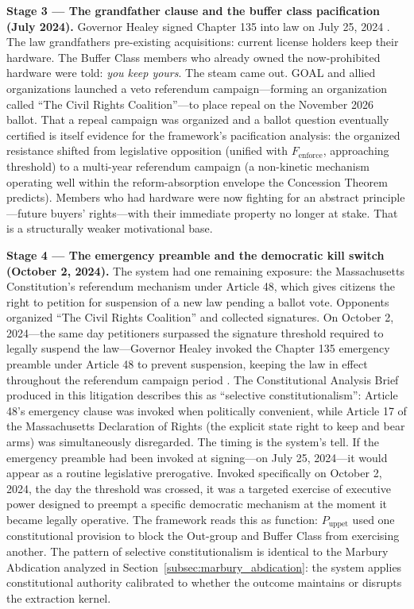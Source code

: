 \begin{keyinsight}
\textbf{Stage 3 --- The grandfather clause and the buffer class pacification (July 2024).} Governor Healey signed Chapter 135 into law on July 25, 2024 \cite{ma_chapter135_2024}. The law grandfathers pre-existing acquisitions: current license holders keep their hardware. The Buffer Class members who already owned the now-prohibited hardware were told: \textit{you keep yours}. The steam came out. GOAL and allied organizations launched a veto referendum campaign---forming an organization called ``The Civil Rights Coalition''---to place repeal on the November 2026 ballot. That a repeal campaign was organized and a ballot question eventually certified is itself evidence for the framework's pacification analysis: the organized resistance shifted from legislative opposition (unified with $F_{\text{enforce}}$, approaching threshold) to a multi-year referendum campaign (a non-kinetic mechanism operating well within the reform-absorption envelope the Concession Theorem predicts). Members who had hardware were now fighting for an abstract principle---future buyers' rights---with their immediate property no longer at stake. That is a structurally weaker motivational base.

\textbf{Stage 4 --- The emergency preamble and the democratic kill switch (October 2, 2024).} The system had one remaining exposure: the Massachusetts Constitution's referendum mechanism under Article 48, which gives citizens the right to petition for suspension of a new law pending a ballot vote. Opponents organized ``The Civil Rights Coalition'' and collected signatures. On October 2, 2024---the same day petitioners surpassed the signature threshold required to legally suspend the law---Governor Healey invoked the Chapter 135 emergency preamble under Article 48 to prevent suspension, keeping the law in effect throughout the referendum campaign period \cite{foleyhoag_emergency_preamble_2024, ma_chapter135_2024}. The Constitutional Analysis Brief produced in this litigation describes this as ``selective constitutionalism'': Article 48's emergency clause was invoked when politically convenient, while Article 17 of the Massachusetts Declaration of Rights (the explicit state right to keep and bear arms) was simultaneously disregarded. The timing is the system's tell. If the emergency preamble had been invoked at signing---on July 25, 2024---it would appear as a routine legislative prerogative. Invoked specifically on October 2, 2024, the day the threshold was crossed, it was a targeted exercise of executive power designed to preempt a specific democratic mechanism at the moment it became legally operative. The framework reads this as function: $P_{\text{uppet}}$ used one constitutional provision to block the Out-group and Buffer Class from exercising another. The pattern of selective constitutionalism is identical to the Marbury Abdication analyzed in Section~\ref{subsec:marbury_abdication}: the system applies constitutional authority calibrated to whether the outcome maintains or disrupts the extraction kernel.


\end{keyinsight}
